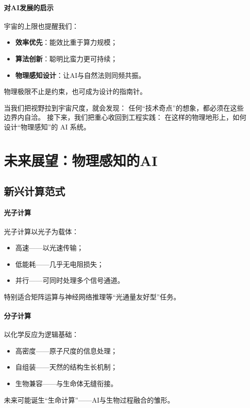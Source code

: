 \paragraph{对AI发展的启示}
宇宙的上限也提醒我们：
\begin{itemize}
\item \textbf{效率优先}：能效比重于算力规模；
\item \textbf{算法创新}：聪明比蛮力更可持续；
\item \textbf{物理感知设计}：让AI与自然法则同频共振。
\end{itemize}
物理极限不止是约束，也可成为设计的指南针。


当我们把视野拉到宇宙尺度，就会发现：  
任何“技术奇点”的想象，都必须在这些边界内自洽。  
接下来，我们把重心收回到工程实践：  
在这样的物理地形上，如何设计“物理感知”的 AI 系统。

\section{未来展望：物理感知的AI}

\subsection{新兴计算范式}

\paragraph{光子计算}
光子计算以光子为载体：
\begin{itemize}
\item 高速——以光速传输；
\item 低能耗——几乎无电阻损失；
\item 并行——可同时处理多个信号通道。
\end{itemize}
特别适合矩阵运算与神经网络推理等“光通量友好型”任务。

\paragraph{分子计算}
以化学反应为逻辑基础：
\begin{itemize}
\item 高密度——原子尺度的信息处理；
\item 自组装——天然的结构生长机制；
\item 生物兼容——与生命体无缝衔接。
\end{itemize}
未来可能诞生“生命计算”——AI与生物过程融合的雏形。

